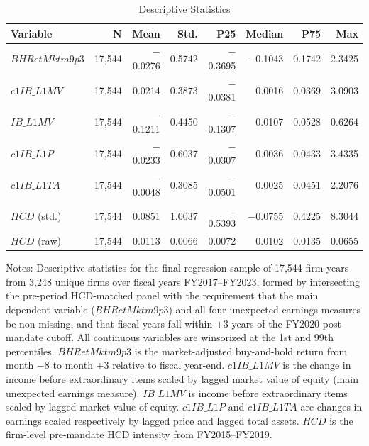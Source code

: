 \documentclass[12pt]{article}
\begin{document}
\begin{table}[ht]
\centering
\caption{Descriptive Statistics}
\label{tab:desc}
\small
\begin{threeparttable}
\begin{tabular}{lrrrrrrr}
\toprule
\textbf{Variable} & \textbf{N} & \textbf{Mean} & \textbf{Std.} & \textbf{P25} & \textbf{Median} & \textbf{P75} & \textbf{Max} \\
\midrule
$BHRetMktm9p3$    & 17{,}544 & $-$0.0276 & 0.5742 & $-$0.3695 & $-$0.1043 & 0.1742 & 2.3425 \\
$c1IB\_L1MV$      & 17{,}544 &  0.0214 & 0.3873 & $-$0.0381 &  0.0016 & 0.0369 & 3.0903 \\
$IB\_L1MV$        & 17{,}544 & $-$0.1211 & 0.4450 & $-$0.1307 &  0.0107 & 0.0528 & 0.6264 \\
$c1IB\_L1P$       & 17{,}544 & $-$0.0233 & 0.6037 & $-$0.0307 &  0.0036 & 0.0433 & 3.4335 \\
$c1IB\_L1TA$      & 17{,}544 & $-$0.0048 & 0.3085 & $-$0.0501 &  0.0025 & 0.0451 & 2.2076 \\
$HCD$ (std.)      & 17{,}544 &  0.0851 & 1.0037 & $-$0.5393 & $-$0.0755 & 0.4225 & 8.3044 \\
$HCD$ (raw)       & 17{,}544 &  0.0113 & 0.0066 &  0.0072 &  0.0102 & 0.0135 & 0.0655 \\
\bottomrule
\end{tabular}
\begin{tablenotes}
\footnotesize
\item Notes: Descriptive statistics for the final regression sample of 17,544 firm-years from 3,248 unique firms over fiscal years FY2017--FY2023, formed by intersecting the pre-period HCD-matched panel with the requirement that the main dependent variable ($BHRetMktm9p3$) and all four unexpected earnings measures be non-missing, and that fiscal years fall within $\pm 3$ years of the FY2020 post-mandate cutoff. All continuous variables are winsorized at the 1st and 99th percentiles. $BHRetMktm9p3$ is the market-adjusted buy-and-hold return from month $-8$ to month $+3$ relative to fiscal year-end. $c1IB\_L1MV$ is the change in income before extraordinary items scaled by lagged market value of equity (main unexpected earnings measure). $IB\_L1MV$ is income before extraordinary items scaled by lagged market value of equity. $c1IB\_L1P$ and $c1IB\_L1TA$ are changes in earnings scaled respectively by lagged price and lagged total assets. $HCD$ is the firm-level pre-mandate HCD intensity from FY2015--FY2019.
\end{tablenotes}
\end{threeparttable}
\end{table}
\end{document}
